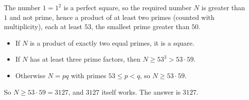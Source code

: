 The number $1=1^2$ is a perfect square, so the required number $N$ is greater than $1$ and not prime, hence a product of at least two primes (counted with multiplicity), each at least $53$, the smallest prime greater than $50$.
\begin{itemize}
\item If $N$ is a product of exactly two equal primes, it is a square.
\item If $N$ has at least three prime factors, then $N\ge53^3>53\cdot59$.
\item Otherwise $N=pq$ with primes $53\le p<q$, so $N\ge53\cdot59$.
\end{itemize}
So $N\ge53\cdot59=3127$, and $3127$ itself works. The answer is $\boxed{3127}$.
